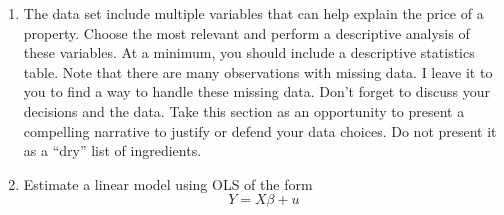 \documentclass[12pt,onecolumn]{article}
\begin{document}
\begin{enumerate}
  
  \item The data set include multiple variables that can help explain the price of a property.  Choose the most relevant and perform a descriptive analysis of these variables. At a minimum, you should include a descriptive statistics table. Note that there are many observations with missing data. I leave it to you to find a way to handle these missing data. Don't forget to discuss your decisions and the data. Take this section as an opportunity to present a compelling narrative to justify or defend your data choices. Do not present it as a ``dry'' list of ingredients.
  \item Estimate a linear model using OLS of the form
  \begin{equation}
    Y = X\beta +u
  \end{equation}


\end{enumerate}
\end{document}
